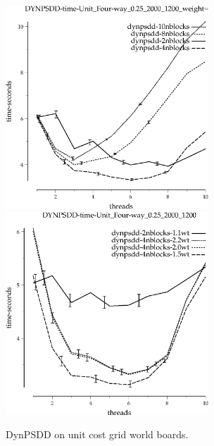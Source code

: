 \documentclass{article}
\begin{document}
\begin{appendices}
\begin{figure}[h!]
\begin{center}
\includegraphics[width=3in]{../graphs/grid_unit_four-way_0.25_2000_1200/DYNPSDD-time-Unit_Four-way_0.25_2000_1200_weight=2.2.eps}
\includegraphics[width=3in]{../graphs/grid_unit_four-way_0.25_2000_1200/DYNPSDD-time-Unit_Four-way_0.25_2000_1200.eps}
\caption{DynPSDD on unit cost grid world boards.}
\label{fig:DynPSDD-grid}
\end{center}
\end{figure}


\end{appendices}
\end{document}
